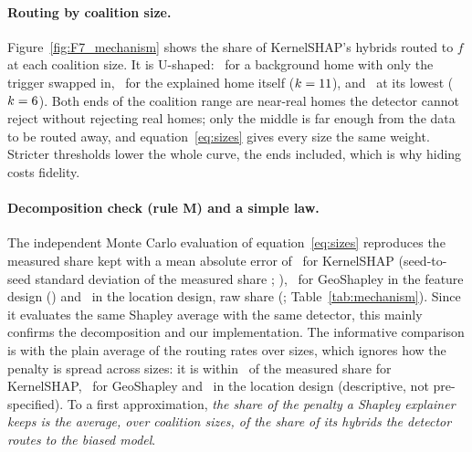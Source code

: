 \paragraph{Routing by coalition size.} Figure~\ref{fig:F7_mechanism} shows the share of KernelSHAP's hybrids routed
to $f$ at each coalition size. It is U-shaped: \MechFeatureKernelSHAPRhoFirst\ for a background home with only the
trigger swapped in, \MechFeatureKernelSHAPRhoLast\ for the explained home itself ($k = 11$), and
\MechFeatureKernelSHAPRhoMin\ at its lowest ($k = 6$). Both ends of the coalition range
are near-real homes the detector cannot reject without rejecting real homes; only the middle is far enough from the
data to be routed away, and equation~\eqref{eq:sizes} gives every size the same weight. Stricter thresholds lower the
whole curve, the ends included, which is why hiding costs fidelity.

\paragraph{Decomposition check (rule M) and a simple law.} The independent Monte Carlo evaluation of
equation~\eqref{eq:sizes} reproduces the measured share kept with a mean absolute error of \MechFeatureKernelSHAPMAE\
for KernelSHAP (seed-to-seed standard deviation of the measured share \MechFeatureKernelSHAPSD;
\RuleMechFeatureKernelSHAP), \MechFeatureGeoShapleyMAE\ for GeoShapley in the feature design
(\RuleMechFeatureGeoShapley) and \MechLocationGeoShapleyMAE\ in the location design, raw share
(\RuleMechLocationGeoShapley; Table~\ref{tab:mechanism}). Since it evaluates the same Shapley average with the same
detector, this mainly confirms the decomposition and our implementation. The informative comparison is with the plain
average of the routing rates over sizes, which ignores how the penalty is spread across sizes: it is within
\MechFeatureKernelSHAPRhoMAE\ of the measured share for KernelSHAP, \MechFeatureGeoShapleyRhoMAE\ for GeoShapley and
\MechLocationGeoShapleyRhoMAE\ in the location design (descriptive, not pre-specified). To a first approximation,
\emph{the share of the penalty a Shapley explainer keeps is the average, over coalition sizes, of the share of its
hybrids the detector routes to the biased model}.

